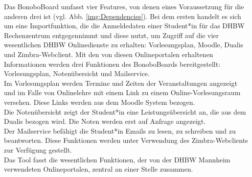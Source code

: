 \documentclass[a4paper,11pt]{scrartcl}
\begin{document}
Das BonoboBoard umfasst vier Features, von denen eines Voraussetzung für die anderen drei ist (vgl. Abb. \ref{img:Dependencies}). Bei dem ersten handelt es sich um eine Importfunktion, die die Anmeldedaten einer Student*in für das DHBW Rechenzentrum entgegennimmt und diese nutzt, um Zugriff auf die vier wesentlichen DHBW Onlinedienste zu erhalten: Vorlesungsplan, Moodle, Dualis und Zimbra-Webclient. Mit den von diesen Onlineportalen erhaltenen Informationen werden drei Funktionen des BonoboBoards bereitgestellt: Vorlesungsplan, Notenübersicht und Mailservice.\\
Im Vorlesungsplan werden Termine und Zeiten der Veranstaltungen angezeigt und im Falle von Onlinelehre mit einem Link zu einem Online-Vorlesungsraum versehen. Diese Links werden aus dem Moodle System bezogen.\\
Die Notenübersicht zeigt der Student*in eine Leistungsübersicht an, die aus dem Dualis bezogen wird. Die Noten werden erst auf Anfrage angezeigt.\\
Der Mailservice befähigt die Student*in Emails zu lesen, zu schreiben und zu beantworten. Diese Funktionen werden unter Verwendung des Zimbra-Webclients zur Verfügung gestellt.\\
Das Tool fasst die wesentlichen Funktionen, der von der DHBW Mannheim verwendeten Onlineportalen, zentral an einer Stelle zusammen.


\end{document}
